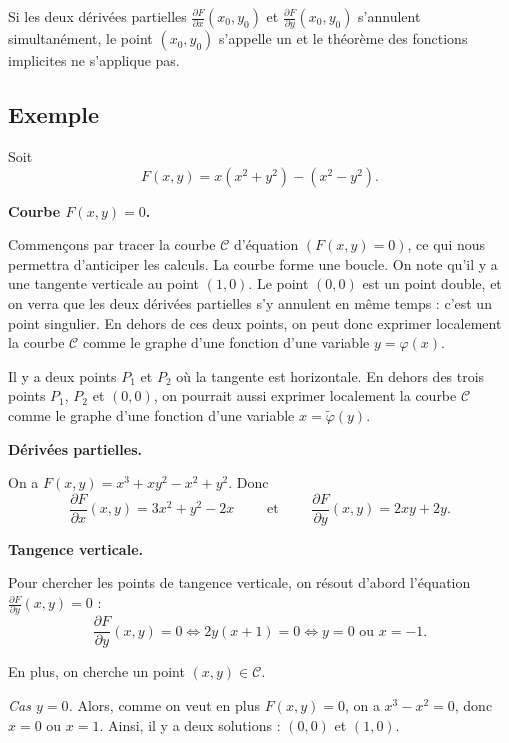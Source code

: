 \documentclass[11pt, class=report,crop=false]{standalone}
\begin{document}
Si les deux dérivées partielles $\frac{\partial F}{\partial x}(x_0,y_0)$ et $\frac{\partial F}{\partial y}(x_0,y_0)$ s'annulent simultanément, le point $(x_0,y_0)$ s'appelle un  et le théorème des fonctions implicites ne s'applique pas.

\subsection{Exemple}

Soit 
$$F(x,y) = x(x^2+y^2)-(x^2-y^2).$$

\textbf{Courbe $F(x,y)=0$.}

Commençons par tracer la courbe $\mathcal{C}$ d'équation $(F(x,y)=0)$, ce qui nous permettra d'anticiper les calculs.
La courbe forme une boucle. On note qu'il y a une tangente verticale au point $(1,0)$.
Le point $(0,0)$ est un point double, et on verra que les deux dérivées partielles s'y annulent en même temps : c'est un point singulier. En dehors de ces deux points, on peut donc exprimer localement la courbe $\mathcal{C}$ comme le graphe d'une fonction d'une variable $y = \varphi(x)$.




Il y a deux points $P_1$ et $P_2$ où la tangente est horizontale. En dehors des trois points $P_1$, $P_2$ et $(0,0)$, on pourrait aussi exprimer localement la courbe $\mathcal{C}$ comme le graphe d'une fonction d'une variable $x = \tilde\varphi(y)$.

\bigskip

\textbf{Dérivées partielles.}

On a $F(x,y) = x^3 + xy^2 -x^2+y^2$. Donc
$$\frac{\partial F}{\partial x}(x,y) = 3x^2+y^2-2x 
\qquad \text{ et } \qquad 
\frac{\partial F}{\partial y}(x,y) = 2xy+2y.$$

\bigskip

\textbf{Tangence verticale.}

Pour chercher les points de tangence verticale, on résout d'abord l'équation $\frac{\partial F}{\partial y}(x,y) = 0$ :
$$\frac{\partial F}{\partial y}(x,y) = 0 \iff  2y(x+1)=0 \iff y=0 \text{ ou } x=-1.$$

En plus, on cherche un point $(x,y) \in \mathcal{C}$.

\emph{Cas $y=0$.} Alors, comme on veut en plus $F(x,y)=0$, on a $x^3-x^2=0$, donc $x=0$ ou $x=1$.
Ainsi, il y a deux solutions : $(0,0)$ et $(1,0)$.
\end{document}
